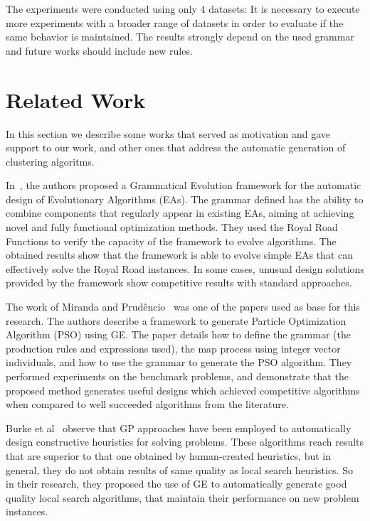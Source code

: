 \documentclass[conference]{IEEEtran}
\begin{document}
	The experiments were conducted using only 4 datasets: It is necessary to execute more experiments with a broader range of datasets in order to evaluate if the same behavior is maintained. The results strongly depend on the used grammar and future works should include new rules.
	
	
	
	
	\section{Related Work} \label{sec:related_work}
	
	In this section we describe some works that served as motivation and gave support to our work, and other ones that address the automatic generation of clustering algoritms.  
	
	
	In~\cite{lourencco2012evolving,lourencco2015IEEE}, the authors proposed a Grammatical Evolution framework for the automatic design of Evolutionary Algorithms (EAs). The grammar defined has the ability to combine components that regularly appear in existing EAs, aiming at achieving novel and fully functional optimization methods. They used the Royal Road Functions to verify the capacity of the framework to evolve algorithms. The obtained results show that the framework is able to evolve simple EAs that can effectively solve the Royal Road instances. In some cases, unusual design solutions provided by the framework show competitive results with standard approaches.
	
	The work of Miranda and Prud\^encio~\cite{miranda2015gefpso} was one of the papers used as base for this research. The authors describe a framework to generate Particle Optimization Algorithm (PSO) using GE. The paper details how to define the grammar (the production rules and expressions used), the map process using integer vector individuals, and how to use the grammar to generate the PSO algorithm. They performed experiments on the benchmark problems, and demonstrate that the proposed method generates useful designs which achieved competitive algorithms when compared to well succeeded algorithms from the literature.
	
	Burke et al~\cite{burke2012grammatical} observe that GP approaches have been employed to automatically design constructive heuristics for solving problems. These algorithms reach results that are superior to that one obtained by human-created heuristics, but in general, they do not obtain results of same quality as local search heuristics. So in their research, they proposed the use of GE to automatically generate good quality local search algorithms, that maintain their performance on new problem instances.
	
\end{document}

